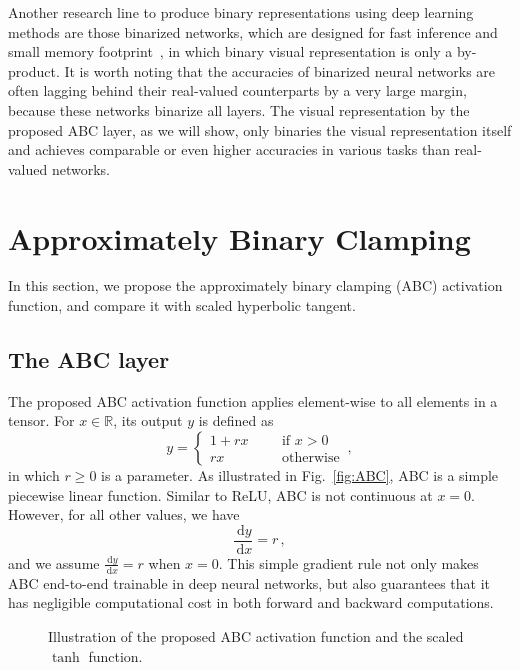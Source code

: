 \documentclass[runningheads]{llncs}
\newcommand{\dx}{\,\mathrm{d}x}
\newcommand{\dy}{\,\mathrm{d}y}
\begin{document}
Another research line to produce binary representations using deep learning methods are those binarized networks, which are designed for fast inference and small memory footprint~\cite{Courbariaux15NIPS,Hubara16NIPS_Binary,Rastegari16ECCV,Li17ICCV}, in which binary visual representation is only a by-product. It is worth noting that the accuracies of binarized neural networks are often lagging behind their real-valued counterparts by a very large margin, because these networks binarize all layers. The visual representation by the proposed ABC layer, as we will show, only binaries the visual representation itself and achieves comparable or even higher accuracies in various tasks than real-valued networks.

\section{Approximately Binary Clamping}

In this section, we propose the approximately binary clamping (ABC) activation function, and compare it with scaled hyperbolic tangent.

\subsection{The ABC layer}

The proposed ABC activation function applies element-wise to all elements in a tensor. For $x \in \mathbb{R}$, its output $y$ is defined as 
\begin{equation}
y = \left\{ 
\begin{aligned}
1 + rx &&& \text{if $x > 0$} \\
rx &&& \text{otherwise}
\end{aligned}
\right. \,,
\end{equation}
in which $r \ge 0$ is a parameter. As illustrated in Fig.~\ref{fig:ABC}, ABC is a simple piecewise linear function. Similar to ReLU, ABC is not continuous at $x=0$. However, for all other values, we have 
\begin{equation}
\frac{\dy}{\dx} = r \,,
\end{equation}
and we assume $\frac{\dy}{\dx}=r$ when $x=0$. This simple gradient rule not only makes ABC end-to-end trainable in deep neural networks, but also guarantees that it has negligible computational cost in both forward and backward computations.

\begin{figure*}[t]
	\centering
	\hspace{12pt}
	\caption{Illustration of the proposed ABC activation function and the scaled $\tanh$ function.} \label{fig:ABC_Tanh}
\end{figure*}
\end{document}
